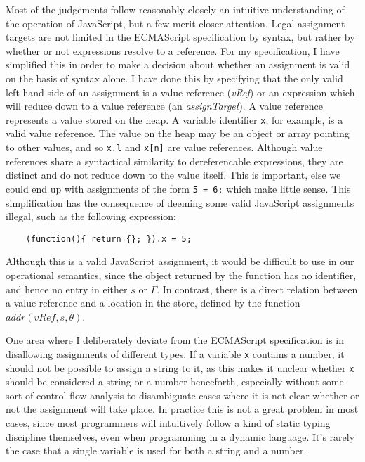 \documentclass[12pt,a4paper,twoside,openright]{report}
\begin{document}
Most of the judgements follow reasonably closely an intuitive understanding of
the operation of JavaScript, but a few merit closer attention. Legal assignment
targets are not limited in the ECMAScript specification by syntax, but rather
by whether or not expressions resolve to a reference. For my specification, I
have simplified this in order to make a decision about whether an assignment is
valid on the basis of syntax alone. I have done this by specifying that the
only valid left hand side of an assignment is a value reference (\textit{vRef})
or an expression which will reduce down to a value reference (an
\textit{assignTarget}). A value reference represents a value stored on the
heap. A variable identifier \texttt{x}, for example, is a valid value
reference. The value on the heap may be an object or array pointing to other
values, and so \texttt{x.l} and \texttt{x[n]} are value references. Although
value references share a syntactical similarity to dereferencable expressions,
they are distinct and do not reduce down to the value itself. This is
important, else we could end up with assignments of the form \texttt{5 = 6;}
which make little sense. This simplification has the consequence of deeming
some valid JavaScript assignments illegal, such as the following expression:
\begin{program}[H]
  \begin{verbatim}
	(function(){ return {}; }).x = 5;
  \end{verbatim}
\end{program}
Although this is a valid JavaScript assignment, it would be difficult to use in
our operational semantics, since the object returned by the function has no
identifier, and hence no entry in either $s$ or $\Gamma$. In contrast, there is
a direct relation between a value reference and a location in the store,
defined by the function $addr(vRef, s, \theta)$.

One area where I deliberately deviate from the ECMAScript specification is in
disallowing assignments of different types. If a variable \texttt{x} contains a
number, it should not be possible to assign a string to it, as this makes it
unclear whether \texttt{x} should be considered a string or a number
henceforth, especially without some sort of control flow analysis to
disambiguate cases where it is not clear whether or not the assignment will
take place. In practice this is not a great problem in most cases, since most
programmers will intuitively follow a kind of static typing discipline
themselves, even when programming in a dynamic language. It's rarely the case
that a single variable is used for both a string and a number.
\end{document}
